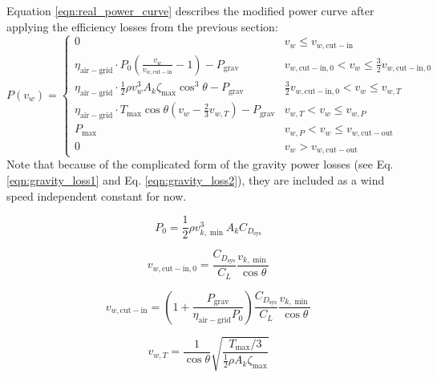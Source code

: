 \documentclass[11pt]{amsart}
\newcommand{\airgrid}{\mathrm{air-grid}}
\newcommand{\cutin}{\mathrm{cut-in}}
\newcommand{\cutout}{\mathrm{cut-out}}
\newcommand{\grav}{\mathrm{grav}}
\newcommand{\kite}{k}
\newcommand{\sys}{\mathrm{sys}}
\newcommand{\wind}{w}
\begin{document}
Equation \ref{eqn:real_power_curve} describes the modified power curve
after applying the efficiency losses from the previous section:
%
\begin{equation}
  \label{eqn:real_power_curve}
P(v_{\wind}) =
\begin{cases}
  0 &
  v_{\wind} \le v_{\wind,\cutin} \\

  \eta_{\airgrid} \cdot P_0 \left(\frac{v_{\wind}}{v_{\wind,\cutin}} - 1 \right) - P_{\grav} &
  v_{\wind,\cutin,0} < v_{\wind} \le \frac{3}{2} v_{\wind,\cutin,0} \\

  \eta_{\airgrid} \cdot \frac{1}{2} \rho v_{\wind}^3 A_{\kite} \zeta_{\max} \cos^3 \theta - P_{\grav} &
  \frac{3}{2} v_{\wind,\cutin,0} < v_{\wind} \le v_{\wind,T} \\

  \eta_{\airgrid} \cdot T_{\max} \cos \theta \left( v_{\wind} - \frac{2}{3} v_{\wind,T} \right) - P_{\grav} &
  v_{\wind,T} < v_{\wind} \le v_{\wind,P} \\

  P_{\max} &
  v_{\wind,P} < v_{\wind} \le v_{\wind,\cutout} \\

  0 &
  v_{\wind} > v_{\wind,\cutout}
\end{cases}
\end{equation}
%
Note that because of the complicated form of the gravity power losses
(see Eq. \ref{eqn:gravity_loss1} and Eq. \ref{eqn:gravity_loss2}), they
are included as a wind speed independent constant for now.

\begin{equation}
P_0 = \frac{1}{2} \rho v_{\kite, \min}^3 A_{\kite} C_{D_{\sys}}
\end{equation}

\begin{equation}
v_{\wind, \cutin, 0} = \frac{C_{D_{\sys}}}{C_L} \frac{v_{\kite, \min}}{\cos \theta}
\end{equation}

\begin{equation}
  v_{\wind, \cutin} = \left(1 + \frac{P_{\grav}}{\eta_{\airgrid} P_0} \right)
  \frac{C_{D_{\sys}}}{C_L} \frac{v_{\kite, \min}}{\cos \theta}
\end{equation}

\begin{equation}
v_{\wind, T} = \frac{1}{\cos \theta}
\sqrt{\frac{T_{\max} / 3}{\frac{1}{2} \rho A_{\kite} \zeta_{\max}}}
\end{equation}
\end{document}
